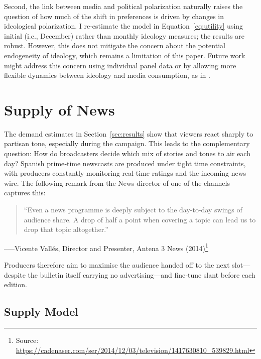 \documentclass[12pt]{article}
\begin{document}
Second, the link between media and political polarization naturally raises the question of how much of the shift in preferences is driven by changes in ideological polarization. I re-estimate the model in Equation~\ref{eq:utility} using initial (i.e., December) rather than monthly ideology measures; the results are robust. However, this does not mitigate the concern about the potential endogeneity of ideology, which remains a limitation of this paper. Future work might address this concern using individual panel data or by allowing more flexible dynamics between ideology and media consumption, as in \cite{martin2017}.

 



\section{Supply of News}


\label{sec:supply}








The demand estimates in Section~\ref{sec:results} show that viewers react sharply to
partisan tone, especially during the campaign.  This  leads to the complementary question:
How do broadcasters decide which mix of stories and tones to air each day? 
Spanish prime‑time newscasts are produced under tight time constraints, with producers
constantly monitoring real‑time ratings and the incoming news wire.  
The following remark from the News director of one of the channels captures this: 


\begin{quote}
	“Even a news programme is deeply subject to the day-to-day swings of audience share.  
	A drop of half a point when covering a topic can lead us to drop that topic altogether.”
\end{quote}
\hspace*{\fill}–––Vicente Vallés, Director and Presenter, Antena 3 News (2014)\footnote{Source: \url{https://cadenaser.com/ser/2014/12/03/television/1417630810_539829.html}}

Producers therefore aim to maximise the audience handed off to the next slot—despite the bulletin itself carrying no advertising—and fine‑tune slant before each edition.

\subsection{Supply Model}
\end{document}
